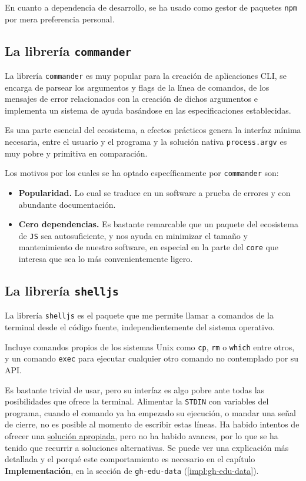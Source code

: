 
En cuanto a dependencia de desarrollo, se ha usado como gestor de paquetes \verb|npm|\cite{npm} por mera preferencia personal.

\subsection{La librería {\tt commander}}
La librería \verb|commander| es muy popular para la creación de aplicaciones \gls{CLI}, se encarga de parsear los argumentos y flags de la línea de comandos, de los mensajes de error relacionados con la creación de dichos argumentos e implementa un sistema de ayuda basándose en las especificaciones establecidas.

Es una parte esencial del ecosistema, a efectos prácticos genera la interfaz mínima necesaria, entre el usuario y el programa y la solución nativa \verb|process.argv| es muy pobre y primitiva en comparación.

Los motivos por los cuales se ha optado específicamente por \verb|commander| son:
\begin{itemize}
    \item \textbf{Popularidad.} Lo cual se traduce en un software a prueba de errores y con abundante documentación.
    \item \textbf{Cero dependencias.} Es bastante remarcable que un paquete del ecosistema de \verb|JS| sea autosuficiente, y nos ayuda en minimizar el tamaño y mantenimiento de nuestro software, en especial en la parte del \verb|core| que interesa que sea lo más convenientemente ligero.
\end{itemize}

\subsection{La librería {\tt shelljs}} \label{shelljs}
La librería {\tt shelljs} es el paquete que me permite llamar a comandos de la terminal desde el código fuente, independientemente del sistema operativo.

Incluye comandos propios de los sistemas Unix como \verb|cp|, \verb|rm| o \verb|which| entre otros, y un comando \verb|exec| para ejecutar cualquier otro comando no contemplado por su API.

Es bastante trivial de usar, pero su interfaz es algo pobre ante todas las posibilidades que ofrece la terminal. Alimentar la \verb|STDIN| con variables del programa, cuando el comando ya ha empezado su ejecución, o mandar una señal de cierre, no es posible al momento de escribir estas líneas. Ha habido intentos de ofrecer una \href{https://github.com/shelljs/shelljs/pull/432}{solución apropiada}, pero no ha habido avances, por lo que se ha tenido que recurrir a soluciones alternativas. Se puede ver una explicación más detallada y el porqué este comportamiento es necesario en el capítulo \textbf{Implementación}, en la sección de \verb|gh-edu-data| (\ref{impl:gh-edu-data}).

